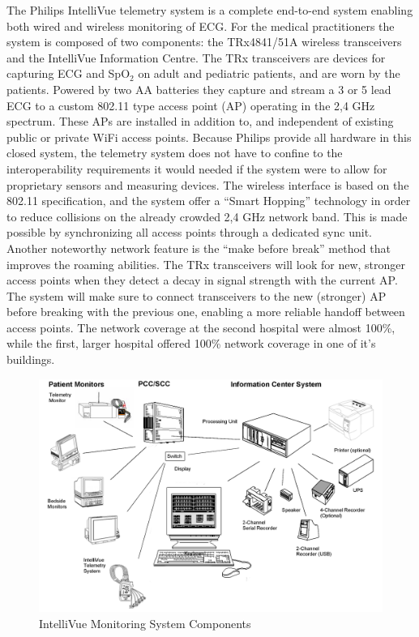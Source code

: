 The Philips IntelliVue telemetry system is a complete end-to-end system enabling both wired and wireless monitoring of ECG. For the medical practitioners the system is composed of two components: the TRx4841/51A wireless transceivers and the IntelliVue Information Centre. The TRx transceivers are devices for capturing ECG and SpO$_2$ on adult and pediatric patients, and are worn by the patients. Powered by two AA batteries they capture and stream a 3 or 5 lead ECG to a custom 802.11 type access point (AP) operating in the 2,4 GHz spectrum. These APs are installed in addition to, and independent of existing public or private WiFi access points. Because Philips provide all hardware in this closed system, the telemetry system does not have to confine to the interoperability requirements it would needed if the system were to allow for proprietary sensors and measuring devices. The wireless interface is based on the 802.11 specification, and the system offer a ``Smart Hopping'' technology in order to reduce collisions on the already crowded 2,4 GHz network band. This is made possible by synchronizing all access points through a dedicated sync unit. Another noteworthy network feature is the ``make before break'' method that improves the roaming abilities. The TRx transceivers will look for new, stronger access points when they detect a decay in signal strength with the current AP. The system will make sure to connect transceivers to the new (stronger) AP before breaking with the previous one, enabling a more reliable handoff between access points. The network coverage at the second hospital were almost 100\%, while the first, larger hospital offered 100\% network coverage in one of it's buildings.

\begin{figure}[H]
  \centering
  \includegraphics[scale=.7]{img/figures/philipsintellivue.png}
  \caption{IntelliVue Monitoring System Components~\cite{IntelliVue:telemetry}}
  \label{fig:intellivue_telemetry_architecture}
\end{figure}


